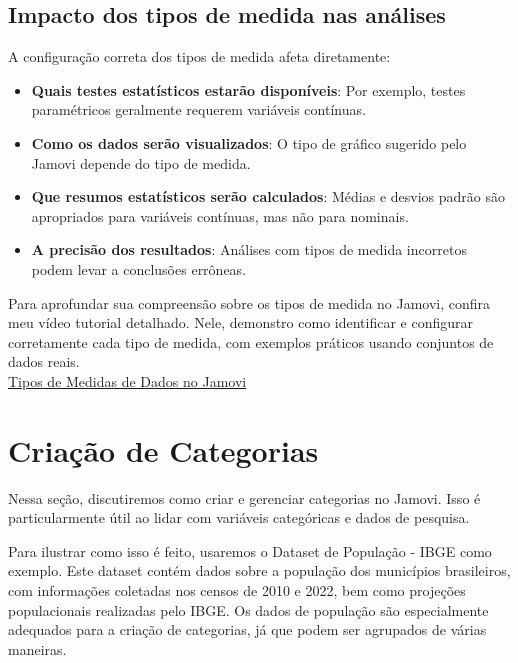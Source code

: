 \subsection{Impacto dos tipos de medida nas análises}

A configuração correta dos tipos de medida afeta diretamente:

\begin{itemize}
    \item \textbf{Quais testes estatísticos estarão disponíveis}: Por exemplo, testes paramétricos geralmente requerem variáveis contínuas.
    \item \textbf{Como os dados serão visualizados}: O tipo de gráfico sugerido pelo Jamovi depende do tipo de medida.
    \item \textbf{Que resumos estatísticos serão calculados}: Médias e desvios padrão são apropriados para variáveis contínuas, mas não para nominais.
    \item \textbf{A precisão dos resultados}: Análises com tipos de medida incorretos podem levar a conclusões errôneas.
\end{itemize}

\begin{tcolorbox}[colback=white,colframe=red,title={\faPlayCircle \ Dica de Conteúdo}]
  Para aprofundar sua compreensão sobre os tipos de medida no Jamovi, confira meu vídeo tutorial detalhado. Nele, demonstro como identificar e configurar corretamente cada tipo de medida, com exemplos práticos usando conjuntos de dados reais.\\
  \textcolor{red}{\faYoutube} \href{https://youtu.be/398uFqX7NRA?si=wSLiUl3nIaABU5KJ}{Tipos de Medidas de Dados no Jamovi}
\end{tcolorbox}


\section{Criação de Categorias}
Nessa seção, discutiremos como criar e gerenciar categorias no Jamovi. Isso é particularmente útil ao lidar com variáveis categóricas e dados de pesquisa.

Para ilustrar como isso é feito, usaremos o Dataset de População - IBGE como exemplo. Este dataset contém dados sobre a população dos municípios brasileiros, com informações coletadas nos censos de 2010 e 2022, bem como projeções populacionais realizadas pelo IBGE. Os dados de população são especialmente adequados para a criação de categorias, já que podem ser agrupados de várias maneiras.

